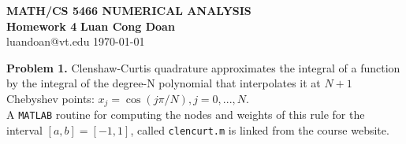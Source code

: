 \documentclass[14pt,a4paper]{article}
\begin{document}
\label{cover}
\begin{center}
	\vspace*{3cm}
	\large{\textbf{MATH/CS 5466 NUMERICAL ANALYSIS \\ Homework 4}}
	\vfill
	\textbf{Luan Cong Doan} \\ luandoan@vt.edu
	\vfill
	\today
\end{center}
\pagebreak

\label{Answer Sheet - Numerical Homework 4}
\doublespacing

\label{Problem 1}
\large\textbf{Problem 1.} Clenshaw-Curtis quadrature approximates the integral of a function by the integral of the degree-N polynomial that interpolates it at $N+1$ Chebyshev points: $x_j = \cos(j\pi/N), j = 0, ..., N$. \\
A \texttt{MATLAB} routine for computing the nodes and weights of this rule for the interval $[a,b] = [-1,1]$, called \texttt{clencurt.m} is linked from the course website.
\end{document}
